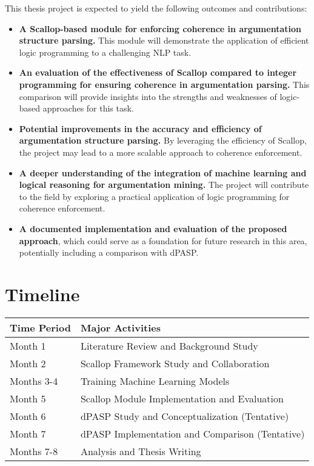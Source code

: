 \documentclass{article}
\begin{document}
This thesis project is expected to yield the following outcomes and
contributions:

\begin{itemize}
    \item \textbf{A Scallop-based module for enforcing coherence in
    argumentation structure parsing.} This module will demonstrate the
    application of efficient logic programming to a challenging NLP task.

    \item \textbf{An evaluation of the effectiveness of Scallop compared to
    integer programming for ensuring coherence in argumentation parsing.} This
    comparison will provide insights into the strengths and weaknesses of
    logic-based approaches for this task.

    \item \textbf{Potential improvements in the accuracy and efficiency of
    argumentation structure parsing.} By leveraging the efficiency of Scallop,
    the project may lead to a more scalable approach to coherence enforcement.

    \item \textbf{A deeper understanding of the integration of machine learning
    and logical reasoning for argumentation mining.} The project will
    contribute to the field by exploring a practical application of logic
    programming for coherence enforcement.

    \item \textbf{A documented implementation and evaluation of the proposed
    approach}, which could serve as a foundation for future research in this
    area, potentially including a comparison with dPASP.
\end{itemize}

\section{Timeline}

\begin{tabular}{|l|l|}
\hline
\textbf{Time Period} & \textbf{Major Activities} \\
\hline
Month 1 & Literature Review and Background Study \\
\hline
Month 2 & Scallop Framework Study and Collaboration \\
\hline
Months 3-4 & Training Machine Learning Models \\
\hline
Month 5 & Scallop Module Implementation and Evaluation \\
\hline
Month 6 & dPASP Study and Conceptualization (Tentative) \\
\hline
Month 7 & dPASP Implementation and Comparison (Tentative) \\
\hline
Months 7-8 & Analysis and Thesis Writing \\
\hline
\end{tabular}
\end{document}
